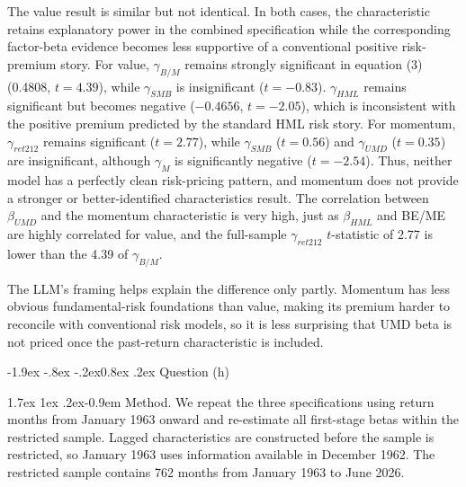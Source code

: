 \documentclass[11pt]{article}
\makeatletter
\renewcommand\subsubsection{\@startsection{subsubsection}{3}{0pt}%
  {-1.9ex \@plus -.8ex \@minus -.2ex}{0.8ex \@plus .2ex}%
  {\normalfont\bfseries\itshape\normalsize\color{psink}}}
\renewcommand\paragraph{\@startsection{paragraph}{4}{0pt}%
  {1.7ex \@plus 1ex \@minus .2ex}{-0.9em}%
  {\normalfont\bfseries\normalsize\color{psink}}}
\newenvironment{tight}
  {\begin{itemize}\setlength{\itemsep}{3pt}\setlength{\parskip}{0pt}%
   \setlength{\topsep}{3pt}\setlength{\leftmargini}{1.4em}}
  {\end{itemize}}
\makeatother
\begin{document}
\begin{tight}
  The value result is similar but not identical. In both cases, the
  characteristic retains explanatory power in the combined specification while the
  corresponding factor-beta evidence becomes less supportive of a conventional positive
  risk-premium story. For value, $\gamma_{B/M}$ remains strongly significant in equation
  (3) (0.4808, $t = 4.39$), while $\gamma_{SMB}$ is insignificant ($t = -0.83$).
  $\gamma_{HML}$ remains significant but becomes negative ($-0.4656$, $t = -2.05$), which
  is inconsistent with the positive premium predicted by the standard HML risk story. For
  momentum, $\gamma_{ret212}$ remains significant ($t = 2.77$), while $\gamma_{SMB}$
  ($t = 0.56$) and $\gamma_{UMD}$ ($t = 0.35$) are insignificant, although $\gamma_M$ is
  significantly negative ($t = -2.54$). Thus, neither model has a perfectly clean
  risk-pricing pattern, and momentum does not provide a stronger or better-identified
  characteristics result. The correlation between $\beta_{UMD}$ and the
  momentum characteristic is very high, just as $\beta_{HML}$ and BE/ME are highly
  correlated for value, and the full-sample $\gamma_{ret212}$ $t$-statistic of 2.77 is
  lower than the 4.39 of $\gamma_{B/M}$.

  The LLM's framing helps explain the difference only partly. Momentum has less obvious
  fundamental-risk foundations than value, making its premium harder to reconcile with
  conventional risk models, so it is less surprising that UMD beta is not priced once the
  past-return characteristic is included.
\end{tight}

\subsubsection{Question (h)}

\paragraph{Method.} We repeat the three specifications using return months from January
1963 onward and re-estimate all first-stage betas within the restricted sample. Lagged
characteristics are constructed before the sample is restricted, so January 1963 uses
information available in December 1962. The restricted sample contains 762 months from
January 1963 to June 2026.
\end{document}
